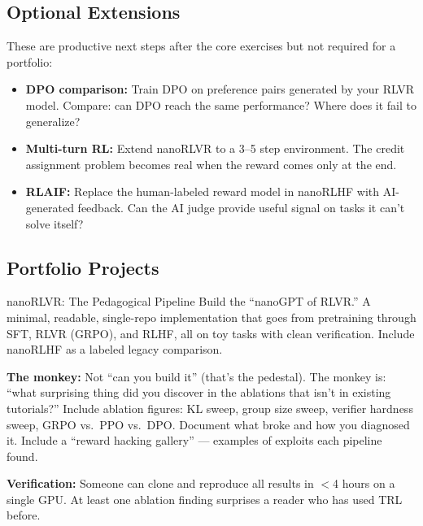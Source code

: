\subsection{Optional Extensions}

These are productive next steps after the core exercises but not required for a portfolio:

\begin{itemize}
  \item \textbf{DPO comparison:} Train DPO on preference pairs generated by your RLVR model. Compare: can DPO reach the same performance? Where does it fail to generalize?
  \item \textbf{Multi-turn RL:} Extend nanoRLVR to a 3--5 step environment. The credit assignment problem becomes real when the reward comes only at the end.
  \item \textbf{RLAIF:} Replace the human-labeled reward model in nanoRLHF with AI-generated feedback. Can the AI judge provide useful signal on tasks it can't solve itself?
\end{itemize}

\subsection{Portfolio Projects}

\begin{portfolio}{nanoRLVR: The Pedagogical Pipeline}
Build the ``nanoGPT of RLVR.'' A minimal, readable, single-repo implementation that goes from pretraining through SFT, RLVR (GRPO), and RLHF, all on toy tasks with clean verification. Include nanoRLHF as a labeled legacy comparison.

\textbf{The monkey:} Not ``can you build it'' (that's the pedestal). The monkey is: ``what surprising thing did you discover in the ablations that isn't in existing tutorials?'' Include ablation figures: KL sweep, group size sweep, verifier hardness sweep, GRPO vs.\ PPO vs.\ DPO. Document what broke and how you diagnosed it. Include a ``reward hacking gallery'' --- examples of exploits each pipeline found.

\textbf{Verification:} Someone can clone and reproduce all results in $<$4 hours on a single GPU. At least one ablation finding surprises a reader who has used TRL before.
\end{portfolio}

